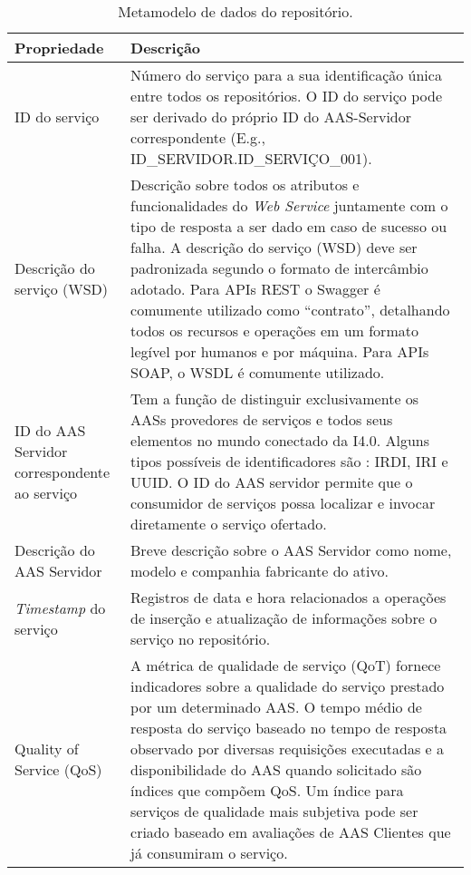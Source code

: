 	\begin{table}[htb]
		\centering
		\caption{Metamodelo de dados do repositório.}
		\label{tab:mdp-repositorio}
		\begin{tabular}{p{3cm}p{12cm}}
			\hline
			\textbf{Propriedade}
			& \textbf{Descrição} \\ 
			
			\hline
			ID do serviço
			& Número do serviço para a sua identificação única entre todos os repositórios. O ID do serviço pode ser derivado do próprio ID do AAS-Servidor correspondente (E.g., ID\_SERVIDOR.ID\_SERVIÇO\_001). \\
			
			\hline
			Descrição do serviço (WSD)
			& Descrição sobre todos os atributos e funcionalidades do \textit{Web Service} juntamente com o tipo de resposta a ser dado em caso de sucesso ou falha. A descrição do serviço (WSD) deve ser padronizada segundo o formato de intercâmbio adotado. Para APIs REST o Swagger é comumente utilizado como ``contrato'', detalhando todos os recursos e operações em um formato legível por humanos e por máquina. Para APIs SOAP, o WSDL é comumente utilizado. \\
			
			\hline
			ID do AAS Servidor correspondente ao serviço
			& Tem a função de distinguir exclusivamente os AASs provedores de serviços e todos seus elementos \cite{adolphs2016structure} no mundo conectado da I4.0. Alguns tipos possíveis de identificadores são \cite{bader2019aas}: IRDI, IRI e UUID. O ID do AAS servidor permite que o consumidor de serviços possa localizar e invocar diretamente o serviço ofertado. \\
			
			\hline
			Descrição do AAS Servidor
			& Breve descrição sobre o AAS Servidor como nome, modelo e companhia fabricante do ativo. \\	
			
			\hline
			\textit{Timestamp} do serviço
			& Registros de data e hora relacionados a operações de inserção e atualização de informações sobre o serviço no repositório. \\
			
			\hline
			Quality of Service (QoS)
			& A métrica de qualidade de serviço (QoT) fornece indicadores sobre a qualidade do serviço prestado por um determinado AAS. O tempo médio de resposta do serviço baseado no tempo de resposta observado por diversas requisições executadas e a disponibilidade do AAS quando solicitado são índices que compõem QoS. Um índice para serviços de qualidade mais subjetiva pode ser criado baseado em avaliações de AAS Clientes que já consumiram o serviço.\\
			
			\hline
		\end{tabular}
	\end{table}
	
